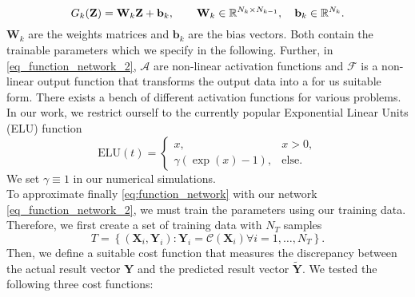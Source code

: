 \begin{equation}\label{eq:G_k}
G_k(\mathbf{Z}) = \mathbf{W}_k \mathbf{Z} + \mathbf{b}_k, \qquad \mathbf{W}_k  \in \mathbb{R}^{N_k \times N_{k-1}}, \quad \mathbf{b}_k \in \mathbb{R}^{N_k}.
\end{equation} 
$\mathbf{W}_k$ are the weights matrices and $\mathbf{b}_k$ are the bias vectors. Both contain the trainable parameters which we specify in the following. 
Further, in \cref{eq_function_network_2}, $\mathcal{A}$ are non-linear activation functions and  $\mathcal{F} $ is a non-linear output function that transforms 
the output data into a for us suitable form. There exists a bench of different activation functions for various problems. In our work, 
we restrict ourself to the currently popular Exponential Linear Units  (ELU) function 
\begin{equation}
\mathrm{ELU}(t) = \begin{cases}x, & x > 0, \\ \gamma (\exp(x)-1), & \text{else.} \end{cases}
\end{equation}
 We set $\gamma\equiv 1$ in our numerical simulations.\\
To approximate finally \eqref{eq:function_network} with our network \eqref{eq_function_network_2}, we must train the parameters using our training data. 
Therefore, we first create a set of training data with $N_T$ samples 
$$
T= \left\{ (\mathbf{X}_i, \mathbf{Y}_i): \mathbf{Y}_i=\mathcal{C}(\mathbf{X}_i) \forall i=1, \dots, N_T \right\}.
$$
Then, we define a suitable cost function that measures the discrepancy between the actual result vector $\mathbf{Y}$ 
and the predicted result vector $\mathbf{\tilde{Y}}$. We tested the following three cost functions:

